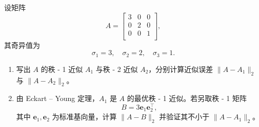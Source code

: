 设矩阵
\[
A =
\begin{bmatrix}
    3 & 0 & 0 \\
    0 & 2 & 0 \\
    0 & 0 & 1 \\
\end{bmatrix},
\]
其奇异值为 \[\sigma_1 = 3, \quad \sigma_2 = 2, \quad \sigma_3 = 1.\]
\begin{enumerate}
    \item 写出 $A$ 的秩 - 1 近似 $A_1$ 与秩 - 2 近似 $A_2$，分别计算近似误差 $\|A - A_1\|_2$ 与 $\|A - A_2\|_2$。
    \item 由 Eckart – Young 定理，$A_1$ 是 $A$ 的最优秩 - 1 近似。若另取秩 - 1 矩阵 \[B = 3 \boldsymbol{e}_1 \boldsymbol{e}_2^\top,\]其中 $\boldsymbol{e}_1, \boldsymbol{e}_2$ 为标准基向量，计算 $\|A - B\|_2$ 并验证其不小于 $\|A - A_1\|_2$。
\end{enumerate}

